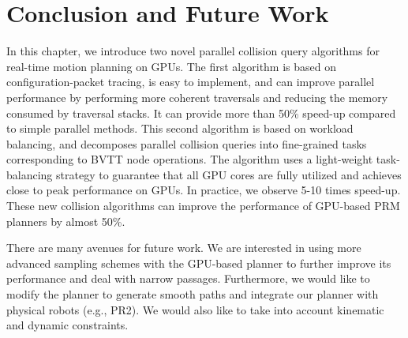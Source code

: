 \section{Conclusion and Future Work}
In this chapter, we introduce two novel parallel collision query algorithms for real-time motion planning on GPUs.
The first algorithm is based on configuration-packet tracing, is easy to implement, and can improve parallel
performance by performing more coherent traversals and reducing the memory consumed by traversal stacks. It can provide
more than 50\% speed-up compared to simple parallel methods. This second algorithm is based on workload balancing, and
decomposes parallel collision queries into fine-grained tasks corresponding to  BVTT node operations. The algorithm
uses a light-weight task-balancing strategy to guarantee that all GPU cores are fully utilized and achieves
close to peak performance on GPUs. In practice, we observe 5-10 times speed-up. These new collision algorithms can improve
the performance of GPU-based PRM planners by almost 50\%.

There are many avenues for future work. We are interested in using more advanced sampling schemes with the
GPU-based planner to further improve its performance and deal with narrow passages. Furthermore, we would like to
modify the planner to generate smooth paths and integrate our planner with physical robots (e.g., PR2).
We would also like to take into account kinematic and dynamic constraints.
